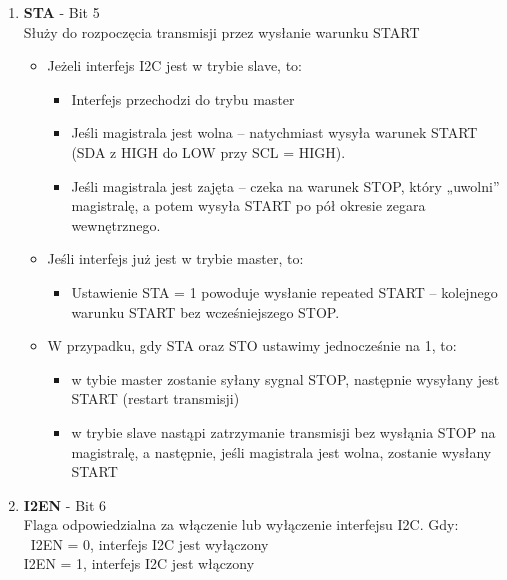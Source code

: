 \begin{itemize}
\begin{enumerate}
        \item \textbf{STA} - Bit 5\\
            Służy do rozpoczęcia transmisji przez wysłanie warunku START
                \begin{itemize}
                    \item Jeżeli interfejs I2C jest w trybie slave, to:
                    \begin{itemize}
                        \item Interfejs przechodzi do trybu master
                        \item Jeśli magistrala jest wolna – natychmiast wysyła warunek START (SDA z HIGH do LOW przy SCL = HIGH).
                        \item Jeśli magistrala jest zajęta – czeka na warunek STOP, który „uwolni” magistralę, a potem wysyła START po pół okresie zegara wewnętrznego.
                    \end{itemize}

                    \item Jeśli interfejs już jest w trybie master, to:
                    \begin{itemize}
                        \item Ustawienie STA = 1 powoduje wysłanie repeated START – kolejnego warunku START bez wcześniejszego STOP.
                    \end{itemize}   
                    \item W przypadku, gdy STA oraz STO ustawimy jednocześnie na 1, to:
                    \begin{itemize}
                        \item w tybie master zostanie syłany sygnal STOP, następnie wysyłany jest START (restart transmisji)
                        \item w trybie slave nastąpi zatrzymanie transmisji bez wysłąnia STOP na magistralę, a następnie, jeśli magistrala jest wolna, zostanie wysłany START
                    \end{itemize}
                \end{itemize}
        \item \textbf{I2EN} - Bit 6\\
        Flaga odpowiedzialna za włączenie lub wyłączenie interfejsu I2C. Gdy:\\\
            I2EN = 0, interfejs I2C jest wyłączony\\
            I2EN = 1, interfejs I2C jest włączony
            

\end{enumerate}
\end{itemize}
